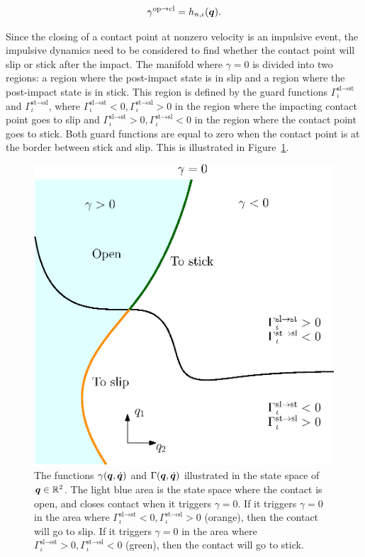 \documentclass[../DC2019003Bouma.tex]{subfiles}
\begin{document}
\begin{align}
\gamma^{\text{op}\rightarrow\text{cl}} = h_{n,\iota}({\boldsymbol{q}}).
\end{align}

Since the closing of a contact point at nonzero velocity is an impulsive event, the impulsive dynamics need to be considered to find whether the contact point will slip or stick after the impact. The manifold where $\gamma = 0$ is divided into two regions: a region where the post-impact state is in slip and a region where the post-impact state is in stick. This region is defined by the guard functions $\Gamma^{\text{sl}\rightarrow\text{st}}_{\iota}$ and $\Gamma^{\text{st}\rightarrow\text{sl}}_{\iota}$, where $\Gamma^{\text{sl}\rightarrow\text{st}}_{\iota}<0,\Gamma^{\text{st}\rightarrow\text{sl}}_{\iota}>0$ in the region where the impacting contact point goes to slip and $\Gamma^{\text{sl}\rightarrow\text{st}}_{\iota}>0,\Gamma^{\text{st}\rightarrow\text{sl}}_{\iota}<0$ in the region where the contact point goes to stick. Both guard functions are equal to zero when the contact point is at the border between stick and slip. This is illustrated in Figure~\ref{fig:guardopcl}. 
\begin{figure}[bt!]
	\centering
	\includegraphics[width=.6\textwidth]{guardopcl.eps}\caption{The functions $\gamma({\boldsymbol{q}},\dot{{\boldsymbol{q}}})$ and $\Gamma({\boldsymbol{q}},\dot{{\boldsymbol{q}}})$ illustrated in the state space of ${\boldsymbol{q}}\in\mathbb{R}^{2}$. The light blue area is the state space where the contact is open, and closes contact when it triggers $\gamma = 0$. If it triggers $\gamma = 0$ in the area where $\Gamma^{\text{sl}\rightarrow\text{st}}_{\iota}<0,\Gamma^{\text{st}\rightarrow\text{sl}}_{\iota}>0$ (orange), then the contact will go to slip. If it triggers $\gamma=0$ in the area where $\Gamma^{\text{sl}\rightarrow\text{st}}_{\iota}>0,\Gamma^{\text{st}\rightarrow\text{sl}}_{\iota}<0$ (green), then the contact will go to stick.}\label{fig:guardopcl}
\end{figure}
\end{document}
